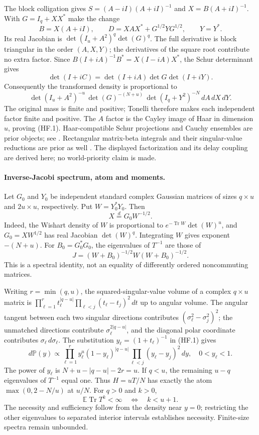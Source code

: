 The block colligation gives $S=(A-iI)(A+iI)^{-1}$ and
$X=B(A+iI)^{-1}$. With $G=I_q+XX^*$ make the change
\[
 B=X(A+iI),\qquad D=XAX^*+G^{1/2}YG^{1/2},\qquad Y=Y^* .
\]
Its real Jacobian is $\det(I_u+A^2)^q\det(G)^q$.
The full derivative is block triangular in the order $(A,X,Y)$;
the derivatives of the square root contribute no extra factor.
Since
$B(I+iA)^{-1}B^*=X(I-iA)X^*$, the Schur determinant gives
\[
 \det(I+iC)=\det(I+iA)\det G\det(I+iY).
\]
Consequently the transformed density is proportional to
\[
 \det(I_u+A^2)^{-u}\,
 \det(G)^{-(N+u)}\,
 \det(I_q+Y^2)^{-N}\,dA\,dX\,dY.                     \tag{HF.2}
\]
The original mass is finite and positive; Tonelli therefore makes
each independent factor finite and positive. The $A$ factor is the
Cayley image of Haar in dimension $u$, proving (HF.1).
Haar-compatible Schur projections and Cauchy ensembles are prior
objects; see \cite{BNN2011Haar}. Rectangular matrix-beta integrals and
their singular-value reductions are prior as well
\cite{Neretin2015Beta}. The displayed factorization and its delay
coupling are derived here; no world-priority claim is made.

\paragraph{Inverse-Jacobi spectrum, atom and moments.}
Let $G_0$ and $Y_0$ be independent standard complex Gaussian matrices
of sizes $q\times u$ and $2u\times u$, respectively. Put $W=Y_0^*Y_0$.
Then
\[
 X\stackrel{d}{=}G_0W^{-1/2}.
\]
Indeed, the Wishart density of $W$ is proportional to
$e^{-\operatorname{Tr}W}\det(W)^u$, and $G_0=XW^{1/2}$ has real
Jacobian $\det(W)^q$. Integrating $W$ gives exponent $-(N+u)$.
For $B_0=G_0^*G_0$, the eigenvalues of $T^{-1}$ are those of
\[
 J=(W+B_0)^{-1/2}W(W+B_0)^{-1/2}.                    \tag{HF.3}
\]
This is a spectral identity, not an equality of differently ordered
noncommuting matrices.

Writing $r=\min(q,u)$, the squared-singular-value volume of a complex
$q\times u$ matrix is
$\prod_{\ell=1}^r t_\ell^{|q-u|}
 \prod_{\ell<j}(t_\ell-t_j)^2\,dt$ up to angular volume.
The angular tangent between each two singular directions contributes
$(\sigma_\ell^2-\sigma_j^2)^2$; the unmatched directions contribute
$\sigma_\ell^{2|q-u|}$, and the diagonal polar coordinate contributes
$\sigma_\ell\,d\sigma_\ell$.
The substitution $y_\ell=(1+t_\ell)^{-1}$ in (HF.1) gives
\[
 d\mathbb P(y)\propto
 \prod_{\ell=1}^r y_\ell^u(1-y_\ell)^{|q-u|}
 \prod_{\ell<j}(y_\ell-y_j)^2\,dy,\quad 0<y_\ell<1.    \tag{HF.4}
\]
The power of $y_\ell$ is $N+u-|q-u|-2r=u$.
If $q<u$, the remaining $u-q$ eigenvalues of $T^{-1}$ equal one.
Thus $H=uT/N$ has exactly the atom $\max(0,2-N/u)$ at $u/N$.
For $q>0$ and $k>0$,
\[
 \mathbb E\operatorname{Tr}T^k<\infty
       \quad\Longleftrightarrow\quad k<u+1 .
\]
The necessity and sufficiency follow from the density near $y=0$;
restricting the other eigenvalues to separated interior intervals
establishes necessity. Finite-size spectra remain unbounded.

